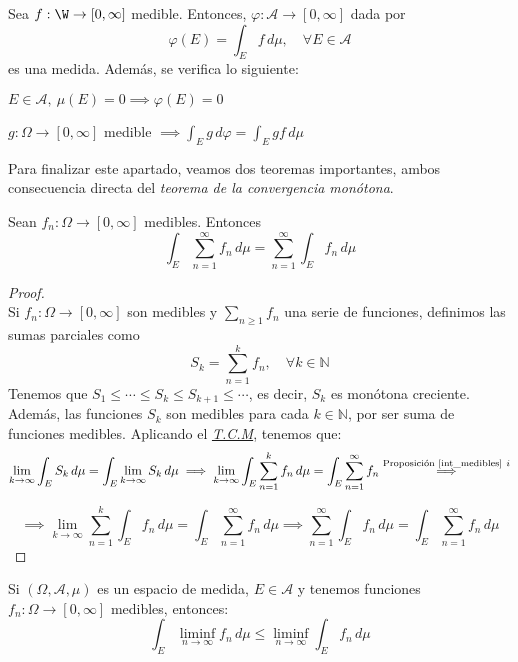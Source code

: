 \begin{nprop} \label {phi_2} Sea $f:\W \to [0,\infty]$ medible. Entonces, $\varphi:\mathscr A \to [0,\infty]$ dada por $$\varphi(E) = \int_E f\, d\mu, \quad \forall E \in \mathscr A$$
es una medida. Además, se verifica lo siguiente:
  \begin{nlist}
  \item $E\in \mathscr A, \ \mu(E) = 0 \implies \varphi(E) = 0$
  \item $g:\Omega \to [0,\infty]$ medible $\displaystyle \implies \int_E g\, d\varphi = \int_E g f\, d\mu$
  \end{nlist}
\end{nprop}

Para finalizar este apartado, veamos dos teoremas importantes, ambos consecuencia directa del \textit{teorema de la convergencia monótona}.

\begin{nth} Sean $f_n: \Omega \to [0,\infty]$ medibles. Entonces
\[
     \int_E \sum_{n=1}^\infty f_n\, d \mu = \sum_{n=1}^\infty \int_E f_n\, d\mu
  \]
\end{nth}

	  \begin{proof} \hfill \\
    Si $f_n:\Omega \to [0,\infty]$ son medibles y $\sum_{n\geq 1}f_n$ una serie de funciones, definimos las sumas parciales como
    \[
      S_k= \sum_{n=1}^k f_n, \quad \forall k \in \mathbb{N}
    \]
    Tenemos que $S_1 \leq \cdots \leq S_k \leq S_{k+1} \leq \cdots $, es decir, $S_k$ es monótona creciente. Además, las funciones $S_k$ son medibles para cada $k \in \mathbb{N}$, por ser suma de funciones medibles. Aplicando el \hyperref[tcm]{\textit{T.C.M}}, tenemos que:
    \[
      \lim_{k \to \infty} \int_E S_k\, d\mu = \int_E \lim_{k\to \infty} S_k\, d\mu \implies \lim_{k \to \infty} \int_E \sum_{n=1}^k f_n\, d\mu = \int_E \sum_{n=1}^\infty f_n \overset{\text{Proposición \ref {int_medibles}} \ i}\implies
    \]

    \[
    \implies \lim_{k\to\infty} \sum_{n=1}^k \int_E f_n\,d\mu = \int_E \sum_{n=1}^\infty f_n\,d\mu \implies \sum_{n=1}^\infty \int_E f_n\,d\mu = \int_E \sum_{n=1}^\infty f_n\,d\mu
    \]
\end{proof}

\begin{lema} 
  Si $(\Omega,\mathscr A,\mu)$ es un espacio de medida, $E\in \mathscr A$ y tenemos funciones $f_n:\Omega \to [0,\infty]$ medibles, entonces:
  \[
    \int_E \liminf_{n \to \infty} f_n\, d\mu \leq \liminf_{n\to \infty} \int_E f_n\, d\mu
  \]
\end{lema}

